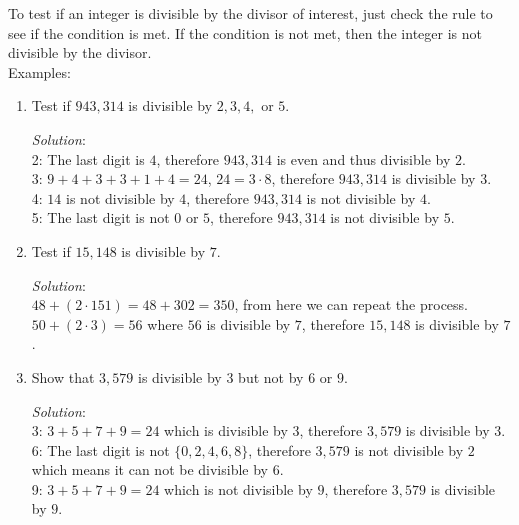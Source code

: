 \documentclass[16pt]{article}
\theoremstyle{remark}
\begin{document}
To test if an integer is divisible by the divisor of interest, just check the rule to see if the condition is met. If the condition is not met, then the integer is not divisible by the divisor.\\

Examples:
\begin{enumerate}
\item Test if $943,314$ is divisible by $2,3,4,$ or $5$.
\begin{mdframed}[style = TheoremFrame]
\textit{Solution}:\\

2: The last digit is $4$, therefore $943,314$ is even and thus divisible by $2$.\\

3: $9+4+3+3+1+4 = 24$, $24 = 3 \cdot 8$, therefore $943,314$ is divisible by $3$.\\

4: $14$ is not divisible by $4$, therefore $943,314$ is not divisible by $4$.\\

5: The last digit is not $0$ or $5$, therefore $943,314$ is not divisible by $5$.
\end{mdframed}
\item Test if $15,148$ is divisible by $7$.
\begin{mdframed}[style = TheoremFrame]
\textit{Solution}:\\

$48+(2 \cdot 151) = 48 + 302 = 350$, from here we can repeat the process.\\
$50 + (2 \cdot 3) = 56$ where $56$ is divisible by $7$, therefore $15,148$ is divisible by $7$.
\end{mdframed}
\item Show that $3,579$ is divisible by $3$ but not by $6$ or $9$.
\begin{mdframed}[style = TheoremFrame]
\textit{Solution}:\\

3: $3+5+7+9=24$ which is divisible by $3$, therefore $3,579$ is divisible by $3$.\\

6: The last digit is not $\{0,2,4,6,8\}$, therefore $3,579$ is not divisible by $2$ which means it can not be divisible by $6$.\\

9: $3+5+7+9 = 24$ which is not divisible by $9$, therefore $3,579$ is divisible by $9$.
\end{mdframed}
\end{enumerate}
\end{document}

